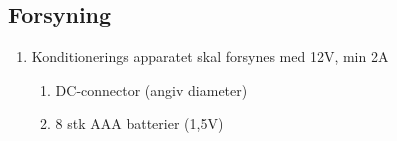 \documentclass[11pt]{article}
\begin{document}
	\subsection{Forsyning}
	\begin{enumerate}
		\setlength\itemsep{0cm} %
		\item Konditionerings apparatet skal forsynes med 12V, min 2A
		\begin{enumerate}
			\item DC-connector (angiv diameter) 
			\item 8 stk AAA batterier (1,5V)
		\end{enumerate}
	\end{enumerate}
	
	
	
	
\end{document}
